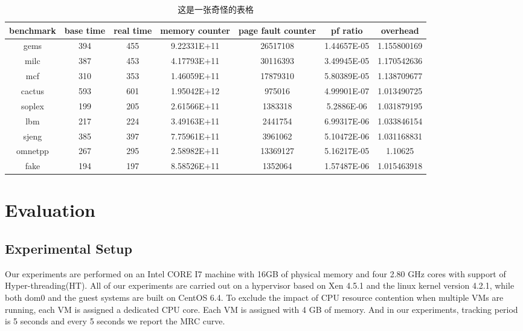 \documentclass[10pt,twocolumn]{article}
\begin{document}
\begin{table}
	\centering
	\caption{这是一张奇怪的表格}
	\label{table4}
	\begin{tabular}{ccccccc}
		\toprule
		benchmark & base time & real time & memory counter & page fault counter & pf ratio & overhead \\
		\midrule
		gems & 394 & 455 & 9.22331E+11 & 26517108 & 1.44657E-05 & 1.155800169 \\
		milc & 387 & 453 & 4.17793E+11 & 30116393 & 3.49945E-05 & 1.170542636 \\
		mcf & 310 & 353 & 1.46059E+11 & 17879310 & 5.80389E-05 & 1.138709677 \\
		cactus & 593 & 601 & 1.95042E+12 & 975016 & 4.99901E-07 & 1.013490725 \\
		soplex & 199 & 205 & 2.61566E+11 & 1383318 & 5.2886E-06 & 1.031879195 \\
		lbm & 217 & 224 & 3.49163E+11 & 2441754 & 6.99317E-06 & 1.033846154 \\
		sjeng & 385 & 397 & 7.75961E+11 & 3961062 & 5.10472E-06 & 1.031168831 \\
		omnetpp & 267 & 295 & 2.58982E+11 & 13369127 & 5.16217E-05 & 1.10625 \\
		fake & 194 & 197 & 8.58526E+11 & 1352064 & 1.57487E-06 & 1.015463918 \\
		\bottomrule
	\end{tabular}
\end{table}

\section{Evaluation}
\subsection{Experimental Setup}
Our experiments are performed on an Intel CORE I7 machine with 16GB of physical memory and four 2.80 GHz cores with support of Hyper-threading(HT). All of our experiments are carried out on a hypervisor based on Xen 4.5.1 and the linux kernel version 4.2.1, while both dom0 and the guest systems are built on CentOS 6.4. To exclude the impact of CPU resource contention when multiple VMs are running, each VM is assigned a dedicated CPU core. Each VM is assigned with 4 GB of memory. And in our experiments, tracking period is 5 seconds and every 5 seconds we report the MRC curve.
\end{document}
